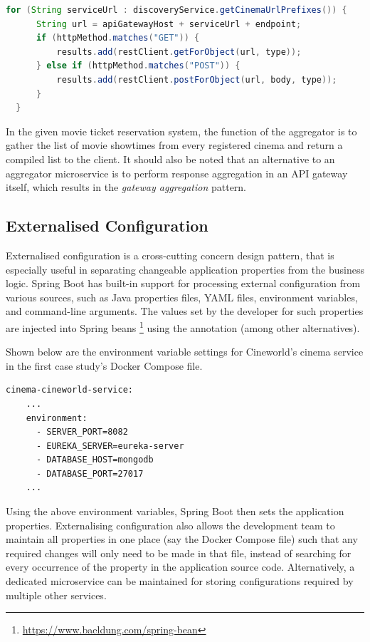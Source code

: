 \begin{lstlisting}[language=Java, caption=Snippet from \code{AggregatorService.java}.]
  for (String serviceUrl : discoveryService.getCinemaUrlPrefixes()) {
      String url = apiGatewayHost + serviceUrl + endpoint;
      if (httpMethod.matches("GET")) {
          results.add(restClient.getForObject(url, type));
      } else if (httpMethod.matches("POST")) {
          results.add(restClient.postForObject(url, body, type));
      }
  }
\end{lstlisting}

In the given movie ticket reservation system, the function of the aggregator is to gather the list of movie showtimes from every registered cinema and return a compiled list to the client. It should also be noted that an alternative to an aggregator microservice is to perform response aggregation in an API gateway itself, which results in the \textit{gateway aggregation} pattern.

\subsection{Externalised Configuration}

Externalised configuration is a cross-cutting concern design pattern, that is especially useful in separating changeable application properties from the business logic. Spring Boot has built-in support for processing external configuration from various sources, such as Java properties files, YAML files, environment variables, and command-line arguments. The values set by the developer for such properties are injected into Spring beans \footnote{\url{https://www.baeldung.com/spring-bean}} using the  annotation (among other alternatives).

Shown below are the environment variable settings for Cineworld's cinema service in the first case study's Docker Compose file.
\begin{lstlisting}[caption=Snippet from \code{docker-compose.yml}.]
  cinema-cineworld-service:
    ...
    environment:
      - SERVER_PORT=8082
      - EUREKA_SERVER=eureka-server
      - DATABASE_HOST=mongodb
      - DATABASE_PORT=27017
    ...
\end{lstlisting}

Using the above environment variables, Spring Boot then sets the application properties. Externalising configuration also allows the development team to maintain all properties in one place (say the Docker Compose file) such that any required changes will only need to be made in that file, instead of searching for every occurrence of the property in the application source code. Alternatively, a dedicated microservice can be maintained for storing configurations required by multiple other services.

